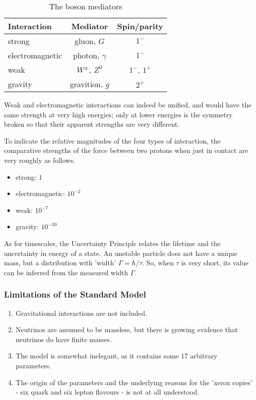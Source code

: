 \documentclass[en, device=normal]{elegantnote}
\begin{document}
\begin{table}[h]
  \centering
  \caption{The boson mediators}
  \begin{tabular}{lcc}
    \toprule
    Interaction & Mediator & Spin/parity \\
    \midrule
    strong & gluon, $G$ & $1^-$ \\
    electromagnetic & photon, $\gamma$ & $1^-$ \\
    weak & $W^\pm$, $Z^0$ & $1^-$, $1^+$ \\
    gravity & gravition, $g$ & $2^+$ \\
    \bottomrule
  \end{tabular}
\end{table}

Weak and electromagnetic interactions can indeed be unified, and would have the same strength 
at very high energies; only at lower energies is the symmetry broken so that their apparent strengths 
are very different.

To indicate the relative magnitudes of the four types of interaction, the comparative 
strengths of the force between two protons when just in contact are very roughly as follows.

\begin{itemize}
  \item strong: $1$
  \item electromagnetic: $10^{-2}$
  \item weak: $10^{-7}$
  \item gravity: $10^{-39}$
\end{itemize}

As for timescales, the Uncertainty Principle relates the lifetime and the uncertainty 
in energy of a state. An unstable particle does not have a unique mass, but a distribution 
with 'width' $\Gamma=\hbar/\tau$. So, when $\tau$ is very short, its value can be inferred 
from the measured width $\Gamma$.

\subsubsection{Limitations of the Standard Model}

\begin{enumerate}
  \item Gravitational interactions are not included.
  \item Neutrinos are assumed to be massless, but there is growing evidence that neutrinos do have finite masses.
  \item The model is somewhat inelegant, as it contains some 17 arbitrary parameters.
  \item The origin of the parameters and the underlying reasons for the 'xerox copies' - six quark and six lepton flavours - is not at all understood.
\end{enumerate}
\end{document}
